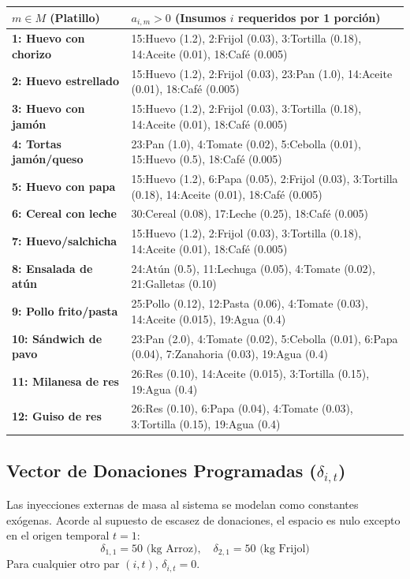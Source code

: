 \documentclass[12pt, a4paper]{article}
\begin{document}
\begin{longtable}{p{4cm} p{11cm}}
\toprule
$m \in M$ (Platillo) & $a_{i,m} > 0$ (Insumos $i$ requeridos por 1 porción) \\
\midrule
\textbf{1: Huevo con chorizo} & 15:Huevo (1.2), 2:Frijol (0.03), 3:Tortilla (0.18), 14:Aceite (0.01), 18:Café (0.005) \\
\textbf{2: Huevo estrellado} & 15:Huevo (1.2), 2:Frijol (0.03), 23:Pan (1.0), 14:Aceite (0.01), 18:Café (0.005) \\
\textbf{3: Huevo con jamón} & 15:Huevo (1.2), 2:Frijol (0.03), 3:Tortilla (0.18), 14:Aceite (0.01), 18:Café (0.005) \\
\textbf{4: Tortas jamón/queso}& 23:Pan (1.0), 4:Tomate (0.02), 5:Cebolla (0.01), 15:Huevo (0.5), 18:Café (0.005) \\
\textbf{5: Huevo con papa} & 15:Huevo (1.2), 6:Papa (0.05), 2:Frijol (0.03), 3:Tortilla (0.18), 14:Aceite (0.01), 18:Café (0.005) \\
\textbf{6: Cereal con leche} & 30:Cereal (0.08), 17:Leche (0.25), 18:Café (0.005) \\
\textbf{7: Huevo/salchicha} & 15:Huevo (1.2), 2:Frijol (0.03), 3:Tortilla (0.18), 14:Aceite (0.01), 18:Café (0.005) \\
\midrule
\textbf{8: Ensalada de atún} & 24:Atún (0.5), 11:Lechuga (0.05), 4:Tomate (0.02), 21:Galletas (0.10) \\
\textbf{9: Pollo frito/pasta} & 25:Pollo (0.12), 12:Pasta (0.06), 4:Tomate (0.03), 14:Aceite (0.015), 19:Agua (0.4) \\
\textbf{10: Sándwich de pavo} & 23:Pan (2.0), 4:Tomate (0.02), 5:Cebolla (0.01), 6:Papa (0.04), 7:Zanahoria (0.03), 19:Agua (0.4) \\
\textbf{11: Milanesa de res} & 26:Res (0.10), 14:Aceite (0.015), 3:Tortilla (0.15), 19:Agua (0.4) \\
\textbf{12: Guiso de res} & 26:Res (0.10), 6:Papa (0.04), 4:Tomate (0.03), 3:Tortilla (0.15), 19:Agua (0.4) \\
\bottomrule
\end{longtable}

\subsection{Vector de Donaciones Programadas ($\delta_{i,t}$)}
Las inyecciones externas de masa al sistema se modelan como constantes exógenas. Acorde al supuesto de escasez de donaciones, el espacio es nulo excepto en el origen temporal $t=1$:
\begin{equation}
    \delta_{1,1} = 50 \text{ (kg Arroz)}, \quad \delta_{2,1} = 50 \text{ (kg Frijol)}
\end{equation}
Para cualquier otro par $(i,t)$, $\delta_{i,t} = 0$.
\end{document}
